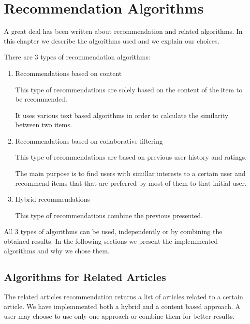 \chapter{Recommendation Algorithms}
\label{chapter:recommendation-system-algorithms}
A great deal has been written about recommendation and related algorithms. In this chapter we describe the algorithms used and we explain our choices.

There are 3 types of recommendation algorithms: 
\begin{enumerate}
	\item Recommendations based on content
		 
		This type of recommendations are solely based on the content of the item to be recommended.
		
		It uses various text based algorithms in order to calculate the similarity between two items.

	\item Recommendations based on collaborative filtering 
		
		This type of recommendations are based on previous user history and ratings.
		 
		The main purpose is to find users with simillar interests to a certain user and recommend items that that are preferred by most of them to that initial user.
	
	\item Hybrid recommendations

		This type of recommendations combine the previous presented.

\end{enumerate}
All 3 types of algorithms can be used, independently or by combining the obtained results.
In the following sections we present the implemmented algorithms and why we chose them.


\section{Algorithms for Related Articles}
\label{sec:algorithms-for-related-articles}
The related articles recommendation returns a list of articles related to a certain article.
We have implemmented both a hybrid and a content based approach.
A user may choose to use only one approach or combine them for better results.

